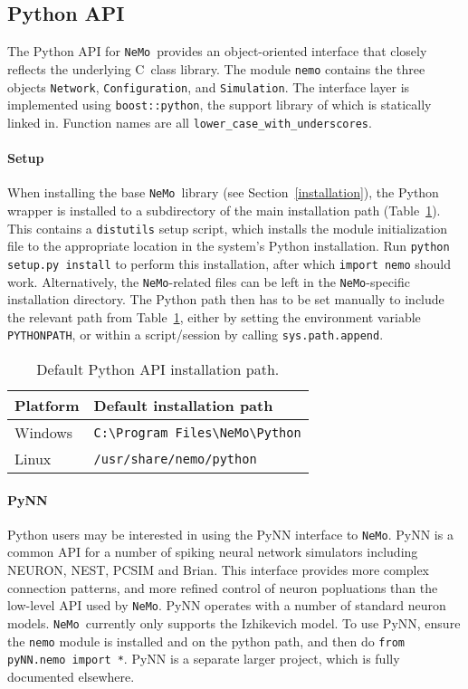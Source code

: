 \documentclass[a4paper]{article}
\newcommand{\nemo}{\texttt{NeMo}}
\newcommand{\code}[1]{\texttt{#1}}
\newcommand{\command}[1]{\texttt{#1}}
\newcommand{\file}[1]{\texttt{#1}}
\newcommand{\library}[1]{\texttt{#1}}
\newcommand{\cpp}{C\nolinebreak\hspace{-.05em}\raisebox{.4ex}{\tiny\bf +}\nolinebreak\hspace{-.10em}\raisebox{.4ex}{\tiny\bf +}}
\begin{document}
\newpage

\subsection{Python API}
\label{api:python}

The Python API for \nemo\ provides an object-oriented interface
	that closely reflects the underlying \cpp\ class library.
The module \library{nemo} contains the three objects
	\code{Network},
	\code{Configuration}, and
	\code{Simulation}.
The interface layer is implemented using \library{boost::python},
	the support library of which is statically linked in.
Function names are all \code{lower\_case\_with\_underscores}.

\paragraph{Setup}
When installing the base \nemo\ library (see Section~\ref{installation}),
	the Python wrapper is installed to a subdirectory of the main installation path
	(Table~\ref{tab:python-path}).
This contains a \command{distutils} setup script,
	which installs the module initialization file to the appropriate 
	location in the system's Python installation.
Run \code{python setup.py install} to perform this installation,
	after which \code{import nemo} should work.
Alternatively,
	the \nemo-related files can be left in the \nemo-specific installation directory.
The Python path then has to be set manually to include the relevant path from Table~\ref{tab:python-path},
	either by setting the environment variable \command{PYTHONPATH},
	or within a script/session by calling \code{sys.path.append}.

\begin{table}[!hb]
	\centering
	\begin{tabular}{ll}
		Platform & Default installation path \\
		\hline
		Windows & \file{C:\textbackslash Program Files\textbackslash NeMo\textbackslash Python} \\
		Linux & \file{/usr/share/nemo/python} \\
		\hline
	\end{tabular}
	\caption{Default Python API installation path.}
	\label{tab:python-path}
\end{table}

\paragraph{PyNN}
Python users may be interested in using the PyNN interface to \nemo.
PyNN is a common API for a number of spiking neural network simulators 
	including NEURON, NEST, PCSIM and Brian.
This interface provides more complex connection patterns,
	and more refined control of neuron popluations
	than the low-level API used by \nemo.
PyNN operates with a number of standard neuron models.
\nemo\ currently only supports the Izhikevich model.
To use PyNN, ensure the \library{nemo} module is installed and on the python path,
	and then do \code{from pyNN.nemo import *}.
PyNN is a separate larger project, which is fully documented elsewhere.
\end{document}
